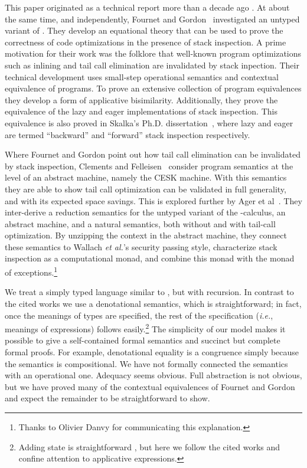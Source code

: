 \documentclass[submission,copyright,creativecommons]{eptcs}
\newcommand{\ie}{{\em i.e.}}
\begin{document}
This paper originated as a technical report more than a decade ago \cite{tr2001-1}.
At about the same time, and independently, Fournet and Gordon~\cite{FournetG03} 
investigated an untyped variant of . They develop an equational theory that can be used to prove the correctness of code optimizations in the presence of stack inspection. A prime motivation for their work was the folklore that well-known program optimizations such as inlining and tail call elimination are invalidated by stack inpection. Their technical development uses small-step operational semantics and contextual equivalence of programs.
To prove an extensive collection of program equivalences they develop a form of applicative bisimilarity. Additionally, they prove the equivalence of the lazy and eager implementations of stack inspection. This equivalence is also proved in Skalka's Ph.D. dissertation~\cite[Theorem 4.1, Chapter 4]{skalka:phd}, where lazy and eager are termed ``backward'' and ``forward'' stack inspection respectively.





Where Fournet and Gordon point out how tail call elimination can be invalidated by stack inspection, Clements and Felleisen~\cite{ClementsF04}
consider program semantics at the level of an abstract machine, namely the 
CESK machine. With this semantics they are able to show tail call optimization can be validated in full generality, and with its expected space savings. This is explored further by Ager et al~\cite{Ager05afunctional}.
They inter-derive a reduction semantics for the untyped
variant of the -calculus, an abstract machine,
and a natural semantics, both without and with tail-call optimization.
By unzipping the context in the abstract machine, they connect these
semantics to Wallach \emph{et al.}'s security passing
style, characterize stack inspection as a
computational monad, and combine this monad with the monad of
exceptions.\footnote{Thanks to Olivier Danvy for communicating this explanation.}

We treat a simply typed language similar to , but with recursion.
In contrast to the cited works we use a denotational semantics, which is 
straightforward; 
in fact, once the meanings
of types are specified, the rest of the specification (\ie, meanings of
expressions) follows easily.\footnote{Adding state is straightforward \cite{BanerjeeNaumann02a}, but here  we follow the cited works and confine attention to applicative expressions.}
The simplicity of our model makes it
possible to give a self-contained formal semantics and succinct but complete formal
proofs.  For example, denotational equality is a congruence simply because the semantics is compositional.
We have not formally connected the semantics with an operational one.
Adequacy seems obvious. Full abstraction is not obvious, but we have proved many of the contextual equivalences of Fournet and Gordon~\cite{FournetG03} and expect the remainder to be straightforward to show.
\end{document}
